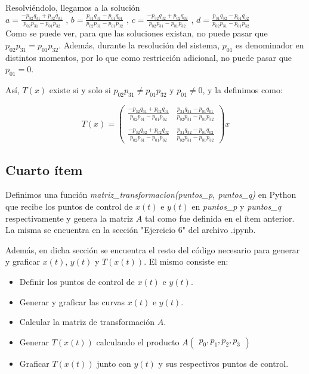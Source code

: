 \documentclass{article}
\begin{document}
Resolviéndolo, llegamos a la solución \\

$a = \frac{-p_{32}q_{31} + p_{02}q_{01}}{p_{02}p_{31} - p_{01}p_{32}} $ , $b = \frac{p_{31}q_{31} - p_{01}q_{01}}{p_{02}p_{31} - p_{01}p_{32}} $ , $c = \frac{-p_{32}q_{32} + p_{02}q_{02}}{p_{02}p_{31} - p_{01}p_{32}} $ , $d = \frac{p_{31}q_{32} - p_{01}q_{02}}{p_{02}p_{31} - p_{01}p_{32}} $ \\

Como se puede ver, para que las soluciones existan, no puede pasar que $p_{02}p_{31} = p_{01}p_{32}$. Además, durante la resolución del sistema, $p_{01}$ es denominador en distintos momentos, por lo que como restricción adicional, no puede pasar  que $p_{01} = 0$.

Así, $T(x)$ existe si y solo si $p_{02}p_{31} \neq p_{01}p_{32}$ y $p_{01} \neq 0$, y la definimos como:

$$ T(x) = 
\begin{pmatrix}
\frac{-p_{32}q_{31} + p_{02}q_{01}}{p_{02}p_{31} - p_{01}p_{32}} & \frac{p_{31}q_{31} - p_{01}q_{01}}{p_{02}p_{31} - p_{01}p_{32}}\\
\\
\frac{-p_{32}q_{32} + p_{02}q_{02}}{p_{02}p_{31} - p_{01}p_{32}} & \frac{p_{31}q_{32} - p_{01}q_{02}}{p_{02}p_{31} - p_{01}p_{32}}
\end{pmatrix}
x
$$

\subsection*{Cuarto ítem}
Definimos una función \textit{matriz\_transformacion(puntos\_p, puntos\_q)} en Python que recibe los puntos de control de $x(t)$ e $y(t)$ en \textit{puntos\_p} y \textit{puntos\_q} respectivamente y genera la matriz $A$ tal como fue definida en el ítem anterior. La misma se encuentra en la sección "Ejercicio 6" del archivo .ipynb. 

Además, en dicha sección se encuentra el resto del código necesario para generar y graficar $x(t)$, $y(t)$ y $T(x(t))$. El mismo consiste en:
\begin{itemize}
    \item Definir los puntos de control de $x(t)$ e $y(t)$.
    \item Generar y graficar las curvas $x(t)$ e $y(t)$.
    \item Calcular la matriz de transformación $A$.
    \item Generar $T(x(t))$ calculando el producto $A\begin{pmatrix}p_0, p_1, p_2, p_3 \end{pmatrix}$
    \item Graficar $T(x(t))$ junto con $y(t)$ y sus respectivos puntos de control.
\end{itemize}
\end{document}
